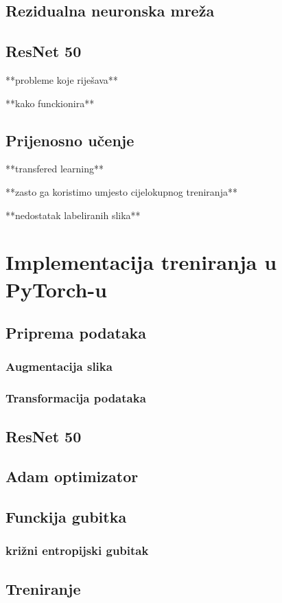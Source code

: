 \documentclass[times, utf8, zavrsni,numeric,pstricks]{fer}
\begin{document}
\subsection{Rezidualna neuronska mreža}

\subsection{ResNet 50}
**probleme koje riješava**

**kako funckionira**

\subsection{Prijenosno učenje}
**transfered learning**

**zasto ga koristimo umjesto cijelokupnog treniranja**

**nedostatak labeliranih slika**

\section{Implementacija treniranja u PyTorch-u}
\subsection{Priprema podataka}
\subsubsection{Augmentacija slika}
\subsubsection{Transformacija podataka}


\subsection{ResNet 50}
\subsection{Adam optimizator}
\subsection{Funckija gubitka}
\subsubsection{križni entropijski gubitak}
\subsection{Treniranje}
\end{document}
